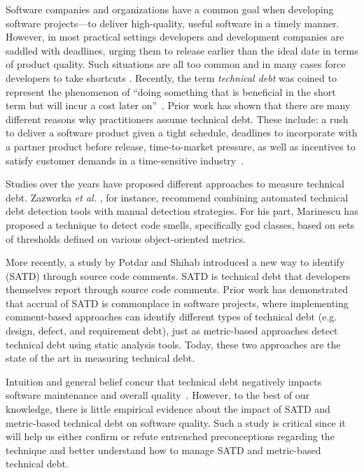 

Software companies and organizations have a common goal when developing software projects---to deliver high-quality, useful software in a timely manner. However, in most practical settings developers and development companies are saddled with deadlines, urging them to release earlier than the ideal date in terms of product quality. Such situations are all too common and in many cases force developers to take shortcuts \cite{kruchten2013technical} \cite{seaman2015technical}. Recently, the term \emph{technical debt} was coined to represent the phenomenon of ``doing something that is beneficial in the short term but will incur a cost later on''~\cite{cunningham1993wycash}. Prior work has shown that there are many different reasons why practitioners assume technical debt. These include: a rush to deliver a software product given a tight schedule, deadlines to incorporate with a partner product before release, time-to-market pressure, as well as incentives to satisfy customer demands in a time-sensitive industry~\cite{lim2012balancing}.

Studies over the years have proposed different approaches to measure technical debt. Zazworka \textit{et al.} \cite{zazworka2011investigating}, for instance, recommend combining automated technical debt detection tools with manual detection strategies. For his part, Marinescu \cite{marinescu2004detection} has proposed a technique to detect code smells, specifically god classes, based on sets of thresholds defined on various object-oriented metrics.

More recently, a study by Potdar and Shihab \cite{ICSM_PotdarS14} introduced a new way to identify \SATD (SATD) through source code comments. SATD is technical debt that developers themselves report through source code comments. Prior work \cite{MTD15p9} has demonstrated that accrual of SATD is commonplace in software projects, where implementing comment-based approaches can identify different types of technical debt (e.g. design, defect, and requirement debt), just as metric-based approaches detect technical debt using static analysis tools. Today, these two approaches are the state of the art in measuring technical debt.\par

Intuition and general belief concur that technical debt negatively impacts software maintenance and overall quality~\cite{zazworka2011investigating,spinola2013investigating,GuoSGCTSSS11,seaman2015technical,kruchten2013technical}. However, to the best of our knowledge, there is little empirical evidence about the impact of SATD and metric-based technical debt on software quality. Such a study is critical since it will help us either confirm or refute entrenched preconceptions regarding the technique and better understand how to manage SATD and metric-based technical debt.\par

